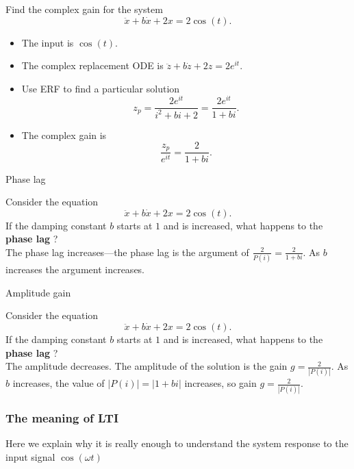 Find the complex gain for the system
\begin{equation*}
  \ddot x + b\dot x + 2x = 2\cos (t).
\end{equation*}

\begin{itemize}
\item The input is $\cos (t)$.
\item The complex replacement ODE is $\ddot z + b\dot z + 2z = 2e^{it}$.
\item Use ERF to find a particular solution
  \begin{equation*}
    z_ p=\frac{2 e^{it}}{i^2 + bi + 2} = \frac{2 e^{it}}{1+ bi}.
  \end{equation*}
\item The complex gain is
  \begin{equation*}
      \frac{z_ p}{e^{it}} = \frac{2}{1+bi}.
  \end{equation*}
\end{itemize}

\begin{exercise}
  Phase lag
\end{exercise}
Consider the equation
\begin{equation*}
  \ddot x + b\dot x + 2x = 2\cos (t).
\end{equation*}
If the damping constant $b$ starts at $1$ and is increased,
what happens to the \textbf{phase lag} ?\\

The phase lag increases—the phase lag is the argument of $\frac{2}{P(i)} = \frac{2}{1+bi}$.
As $b$ increases the argument increases.

\begin{exercise}
  Amplitude gain
\end{exercise}
Consider the equation
\begin{equation*}
  \ddot x + b\dot x + 2x = 2\cos (t).
\end{equation*}
If the damping constant $b$ starts at $1$ and is increased,
what happens to the \textbf{phase lag} ? \\

The amplitude decreases. The amplitude of the solution is the gain
$g=\frac{2}{|P(i)|}$.
As $b$ increases, the value of $|P(i)| = |1+bi|$ increases, so gain $g=\frac{2}{|P(i)|}$. 

\clearpage
\subsubsection{The meaning of LTI}
Here we explain why it is really enough to understand
the system response to the input signal $\cos (\omega t)$\\

